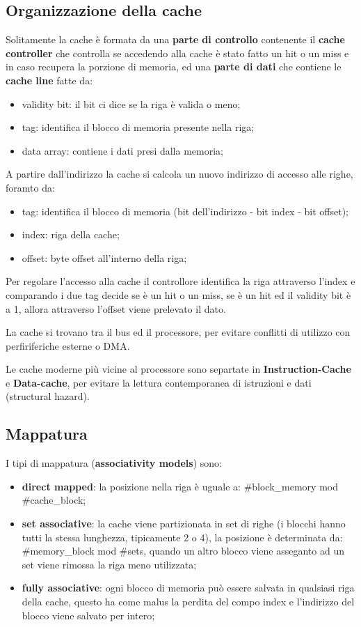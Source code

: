 \documentclass[12pt]{article}
\begin{document}
\subsection{Organizzazione della cache}
Solitamente la cache \`e formata da una \textbf{parte di controllo} contenente il \textbf{cache controller} che controlla se accedendo alla cache \`e stato fatto un hit o un miss e in caso recupera la porzione di memoria, ed una \textbf{parte di dati} che contiene le \textbf{cache line} fatte da:
\begin{itemize}
    \item validity bit: il bit ci dice se la riga \`e valida o meno;
    \item tag: identifica il blocco di memoria presente nella riga;
    \item data array: contiene i dati presi dalla memoria;
\end{itemize}
A partire dall'indirizzo la cache si calcola un nuovo indirizzo di accesso alle righe, foramto da:
\begin{itemize}
    \item tag: identifica il blocco di memoria (bit dell'indirizzo - bit index - bit offset);
    \item index: riga della cache;
    \item offset: byte offset all'interno della riga;
\end{itemize}
Per regolare l'accesso alla cache il controllore identifica la riga attraverso l'index e comparando i due tag decide se \`e un hit o un miss, se \`e un hit ed il validity bit \`e a 1, allora attraverso l'offset viene prelevato il dato.

La cache si trovano tra il bus ed il processore, per evitare conflitti di utilizzo con perfiriferiche esterne o DMA.

Le cache moderne pi\`u vicine al processore sono separtate in \textbf{Instruction-Cache} e \textbf{Data-cache}, per evitare la lettura contemporanea di istruzioni e dati (structural hazard).

\subsection{Mappatura}
I tipi di mappatura (\textbf{associativity models}) sono:
\begin{itemize}
    \item \textbf{direct mapped}: la posizione nella riga \`e uguale a: \#block\_memory mod \#cache\_block;
    \item \textbf{set associative}: la cache viene partizionata in set di righe (i blocchi hanno tutti la stessa lunghezza, tipicamente 2 o 4), la posizione \`e determinata da: \#memory\_block mod \#sets, quando un altro blocco viene asseganto ad un set viene rimossa la riga meno utilizzata;
    \item \textbf{fully associative}: ogni blocco di memoria pu\`o essere salvata in qualsiasi riga della cache, questo ha come malus la perdita del compo index e l'indirizzo del blocco viene salvato per intero;
\end{itemize}
\end{document}
